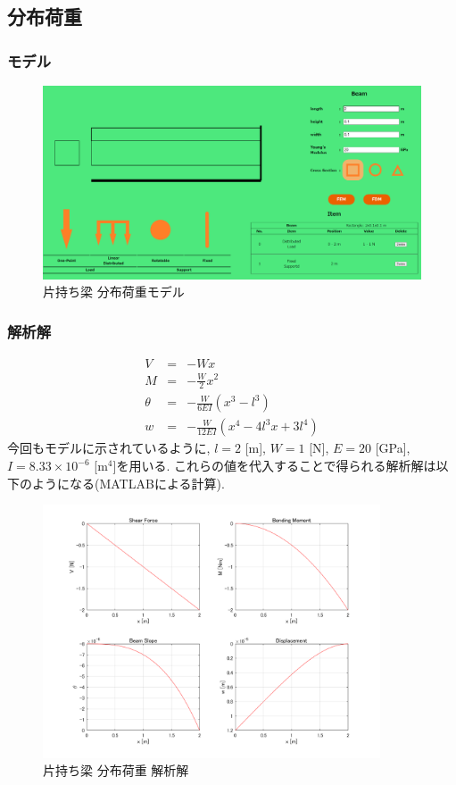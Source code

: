 \documentclass{jsarticle}
\begin{document}
\newpage
\subsection{分布荷重}
\subsubsection{モデル}
\begin{figure}[H]
\begin{center}
\includegraphics[width=13cm]{cantilever_distributed_model.PNG}
\caption{片持ち梁 分布荷重モデル}
\end{center}
\end{figure}

\subsubsection{解析解}
\begin{eqnarray*}
V &=& -Wx \\
M &=& -\frac{W}{2}x^2 \\
\theta &=& -\frac{W}{6EI}\left(x^3-l^3\right) \\
w &=& -\frac{W}{12EI}\left(x^4-4l^3x+3l^4\right)
\end{eqnarray*}
今回もモデルに示されているように, $l=2$ [m], $W=1$ [N], $E=20$ [GPa], $I=8.33\times10^{-6}$ [m$^4$]を用いる. これらの値を代入することで得られる解析解は以下のようになる(MATLABによる計算).

\begin{figure}[H]
\begin{center}
\includegraphics[width=10cm]{Cantilever_Distributed_Beam.png}
\caption{片持ち梁 分布荷重 解析解}
\end{center}
\end{figure}
\end{document}
